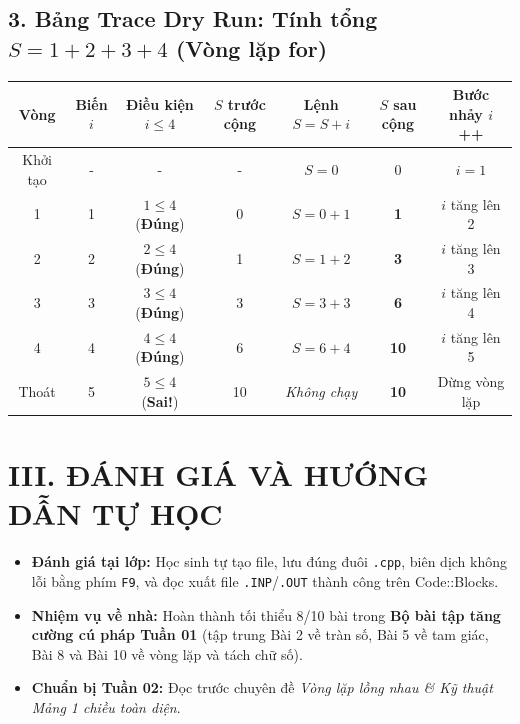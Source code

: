 \documentclass[11pt,a4paper]{article}
\begin{document}
\subsection*{\color{AsianBlue}3. Bảng Trace Dry Run: Tính tổng $S = 1 + 2 + 3 + 4$ (Vòng lặp for)}
\begin{center}
\footnotesize
\begin{tabular}{@{}ccccccc@{}}
\toprule
\textbf{Vòng} & \textbf{Biến $i$} & \textbf{Điều kiện $i \le 4$} & \textbf{$S$ trước cộng} & \textbf{Lệnh $S = S + i$} & \textbf{$S$ sau cộng} & \textbf{Bước nhảy $i$++} \\
\midrule
Khởi tạo & - & - & - & $S = 0$ & 0 & $i = 1$ \\
1 & 1 & $1 \le 4$ (\textbf{Đúng}) & 0 & $S = 0 + 1$ & \textbf{1} & $i$ tăng lên 2 \\
2 & 2 & $2 \le 4$ (\textbf{Đúng}) & 1 & $S = 1 + 2$ & \textbf{3} & $i$ tăng lên 3 \\
3 & 3 & $3 \le 4$ (\textbf{Đúng}) & 3 & $S = 3 + 3$ & \textbf{6} & $i$ tăng lên 4 \\
4 & 4 & $4 \le 4$ (\textbf{Đúng}) & 6 & $S = 6 + 4$ & \textbf{10} & $i$ tăng lên 5 \\
Thoát & 5 & $5 \le 4$ (\textbf{Sai!}) & 10 & \textit{Không chạy} & \textbf{10} & Dừng vòng lặp \\
\bottomrule
\end{tabular}
\end{center}

\section*{\color{AsianDarkBlue}III. ĐÁNH GIÁ VÀ HƯỚNG DẪN TỰ HỌC}
\begin{itemize}
    \setlength{\itemsep}{2pt}
    \item \textbf{Đánh giá tại lớp:} Học sinh tự tạo file, lưu đúng đuôi \texttt{.cpp}, biên dịch không lỗi bằng phím \texttt{F9}, và đọc xuất file \texttt{.INP}/\texttt{.OUT} thành công trên Code::Blocks.
    \item \textbf{Nhiệm vụ về nhà:} Hoàn thành tối thiểu 8/10 bài trong \textbf{Bộ bài tập tăng cường cú pháp Tuần 01} (tập trung Bài 2 về tràn số, Bài 5 về tam giác, Bài 8 và Bài 10 về vòng lặp và tách chữ số).
    \item \textbf{Chuẩn bị Tuần 02:} Đọc trước chuyên đề \textit{Vòng lặp lồng nhau \& Kỹ thuật Mảng 1 chiều toàn diện}.
\end{itemize}
\end{document}
